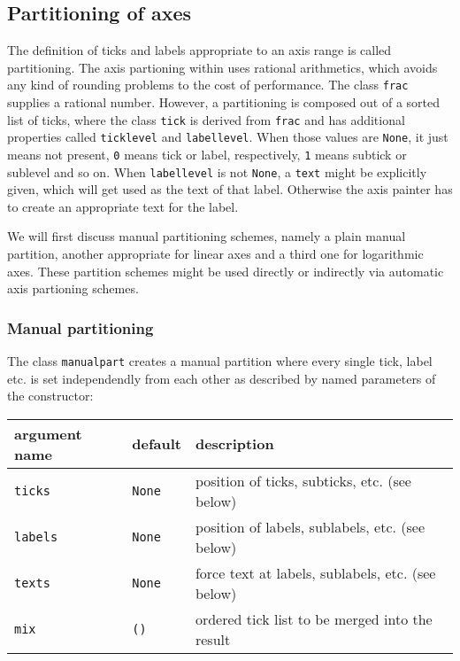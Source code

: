 \subsection{Partitioning of axes}

The definition of ticks and labels appropriate to an axis range is
called partitioning. The axis partioning within \PyX{} uses rational
arithmetics, which avoids any kind of rounding problems to the cost of
performance. The class \verb|frac| supplies a rational number.
However, a partitioning is composed out of a sorted list of ticks,
where the class \verb|tick| is derived from \verb|frac| and has
additional properties called \verb|ticklevel| and \verb|labellevel|.
When those values are \verb|None|, it just means not present, \verb|0|
means tick or label, respectively, \verb|1| means subtick or sublevel
and so on. When \verb|labellevel| is not \verb|None|, a \verb|text|
might be explicitly given, which will get used as the text of that
label. Otherwise the axis painter has to create an appropriate text
for the label.

We will first discuss manual partitioning schemes, namely a plain
manual partition, another appropriate for linear axes and a third one
for logarithmic axes. These partition schemes might be used directly
or indirectly via automatic axis partioning schemes.

\subsubsection{Manual partitioning}

The class \verb|manualpart| creates a manual partition where every
single tick, label etc. is set independendly from each other as
described by named parameters of the constructor:

\medskip
\begin{tabularx}{\linewidth}{ll>{\raggedright\arraybackslash}X}
argument name&default&description\\
\hline
\texttt{ticks}&\texttt{None}&position of ticks, subticks, etc. (see below)\\
\texttt{labels}&\texttt{None}&position of labels, sublabels, etc. (see below)\\
\texttt{texts}&\texttt{None}&force text at labels, sublabels, etc. (see below)\\
\texttt{mix}&\texttt{()}&ordered tick list to be merged into the result\\
\end{tabularx}
\medskip

